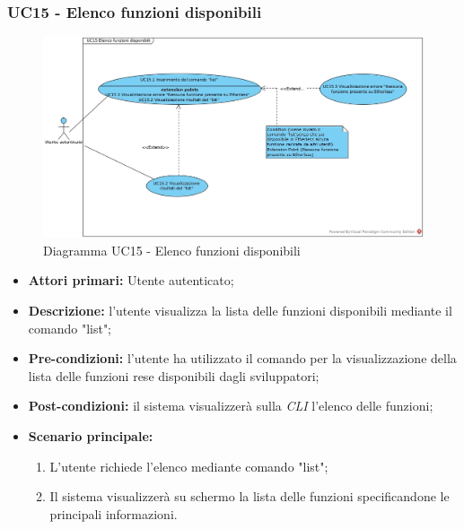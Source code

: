 \subsubsection{UC15 - Elenco funzioni disponibili}
\begin{figure}[h]
	\centering
	\includegraphics[width=\linewidth]{res/img/UC15.jpg}
	\caption{Diagramma UC15 - Elenco funzioni disponibili}
\end{figure}
\begin{itemize}
	\item \textbf{Attori primari:} Utente autenticato;
	\item \textbf{Descrizione:} l'utente visualizza la lista delle funzioni disponibili mediante il comando "list";
	\item \textbf{Pre-condizioni:} l'utente ha utilizzato il comando per la visualizzazione della lista delle funzioni rese disponibili dagli sviluppatori;
	\item \textbf{Post-condizioni:} il sistema visualizzerà sulla \textit{CLI\glo} l'elenco delle funzioni;
	\item \textbf{Scenario principale:}
	\begin{enumerate}
		\item L'utente richiede l'elenco mediante comando "list";
		\item Il sistema visualizzerà su schermo la lista delle funzioni specificandone le principali informazioni.
	\end{enumerate}
\end{itemize}
